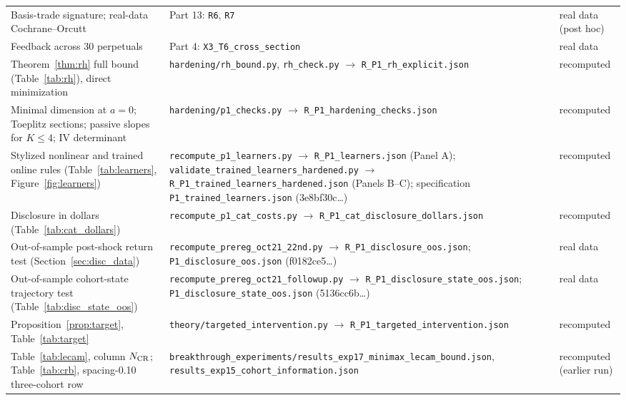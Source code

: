 \documentclass[12pt]{article}
\theoremstyle{definition}
\theoremstyle{remark}
\begin{document}
\begin{longtable}{p{}p{}p{}}
Basis-trade signature; real-data Cochrane--Orcutt & Part 13: \nolinkurl{R6}, \nolinkurl{R7} & real data (post hoc)\\
Feedback across 30 perpetuals & Part 4: \nolinkurl{X3_T6_cross_section} & real data\\
Theorem~\ref{thm:rh} full bound (Table~\ref{tab:rh}), direct minimization & \nolinkurl{hardening/rh_bound.py}, \nolinkurl{rh_check.py} $\to$ \nolinkurl{R_P1_rh_explicit.json} & recomputed\\
Minimal dimension at $a=0$; Toeplitz sections; passive slopes for $K\le4$; IV determinant & \nolinkurl{hardening/p1_checks.py} $\to$ \nolinkurl{R_P1_hardening_checks.json} & recomputed\\
Stylized nonlinear and trained online rules (Table~\ref{tab:learners}, Figure~\ref{fig:learners}) & \texttt{recompute\_\allowbreak p1\_\allowbreak learners.py} $\to$ \texttt{R\_P1\_\allowbreak learners.json} (Panel A); \texttt{validate\_\allowbreak trained\_\allowbreak learners\_\allowbreak hardened.py} $\to$ \texttt{R\_P1\_\allowbreak trained\_\allowbreak learners\_\allowbreak hardened.json} (Panels B--C); specification \texttt{P1\_\allowbreak trained\_\allowbreak learners.json} (3e8bf30c\ldots) & recomputed\\
Disclosure in dollars (Table~\ref{tab:cat_dollars}) & \texttt{recompute\_\allowbreak p1\_\allowbreak cat\_\allowbreak costs.py} $\to$ \texttt{R\_P1\_\allowbreak cat\_\allowbreak disclosure\_\allowbreak dollars.json} & recomputed\\
Out-of-sample post-shock return test (Section~\ref{sec:disc_data}) & \texttt{recompute\_\allowbreak prereg\_\allowbreak oct21\_\allowbreak 22nd.py} $\to$ \texttt{R\_P1\_\allowbreak disclosure\_\allowbreak oos.json}; \texttt{P1\_\allowbreak disclosure\_\allowbreak oos.json} (f0182ce5\ldots) & real data\\
Out-of-sample cohort-state trajectory test (Table~\ref{tab:disc_state_oos}) & \texttt{recompute\_\allowbreak prereg\_\allowbreak oct21\_\allowbreak followup.py} $\to$ \texttt{R\_P1\_\allowbreak disclosure\_\allowbreak state\_\allowbreak oos.json}; \texttt{P1\_\allowbreak disclosure\_\allowbreak state\_\allowbreak oos.json} (5136cc6b\ldots) & real data\\
\bottomrule
Proposition~\ref{prop:target}, Table~\ref{tab:target} & \nolinkurl{theory/targeted_intervention.py} $\to$ \nolinkurl{R_P1_targeted_intervention.json} & recomputed\\
Table~\ref{tab:lecam}, column $N_{\rm CR}$; Table~\ref{tab:crb}, spacing-0.10 three-cohort row & \nolinkurl{breakthrough_experiments/results_exp17_minimax_lecam_bound.json}, \nolinkurl{results_exp15_cohort_information.json} & recomputed (earlier run)\\

\end{longtable}
\end{document}
